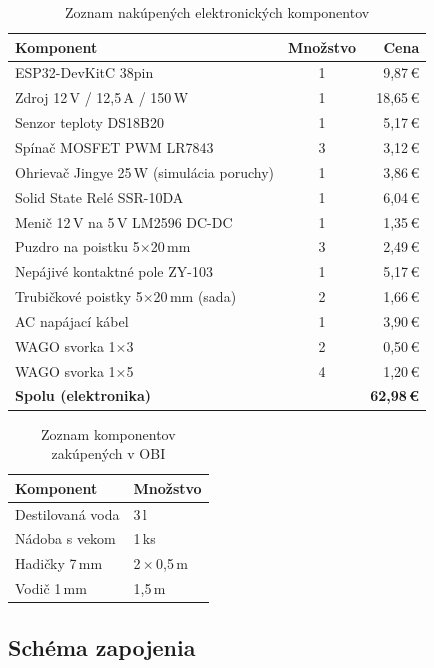 \begin{table}[H]
\centering
\renewcommand{\arraystretch}{1.3}
\begin{tabular}{|l|c|r|}
\hline
\textbf{Komponent} & \textbf{Množstvo} & \textbf{Cena} \\
\hline
ESP32-DevKitC 38pin & 1 & 9,87\,\euro{} \\
Zdroj 12\,V / 12,5\,A / 150\,W & 1 & 18,65\,\euro{} \\
Senzor teploty DS18B20 & 1 & 5,17\,\euro{} \\
Spínač MOSFET PWM LR7843 & 3 & 3,12\,\euro{} \\
Ohrievač Jingye 25\,W (simulácia poruchy) & 1 & 3,86\,\euro{} \\
Solid State Relé SSR-10DA & 1 & 6,04\,\euro{} \\
Menič 12\,V na 5\,V LM2596 DC-DC & 1 & 1,35\,\euro{} \\
Puzdro na poistku 5$\times$20\,mm & 3 & 2,49\,\euro{} \\
Nepájivé kontaktné pole ZY-103 & 1 & 5,17\,\euro{} \\
Trubičkové poistky 5$\times$20\,mm (sada) & 2 & 1,66\,\euro{} \\
AC napájací kábel & 1 & 3,90\,\euro{} \\
WAGO svorka 1$\times$3 & 2 & 0,50\,\euro{} \\
WAGO svorka 1$\times$5 & 4 & 1,20\,\euro{} \\
\hline
\multicolumn{2}{|l|}{\textbf{Spolu (elektronika)}} & \textbf{62,98\,\euro{}} \\
\hline
\end{tabular}
\caption{Zoznam nakúpených elektronických komponentov}
\end{table}

\begin{table}[H]
\centering
\renewcommand{\arraystretch}{1.3}
\begin{tabular}{|l|l|}
\hline
\textbf{Komponent} & \textbf{Množstvo} \\
\hline
Destilovaná voda & 3\,l \\
Nádoba s vekom & 1\,ks \\
Hadičky 7\,mm & 2\,$\times$\,0,5\,m \\
Vodič 1\,mm & 1,5\,m \\
\hline
\end{tabular}
\caption{Zoznam komponentov zakúpených v OBI}
\end{table}

\subsection{Schéma zapojenia}

